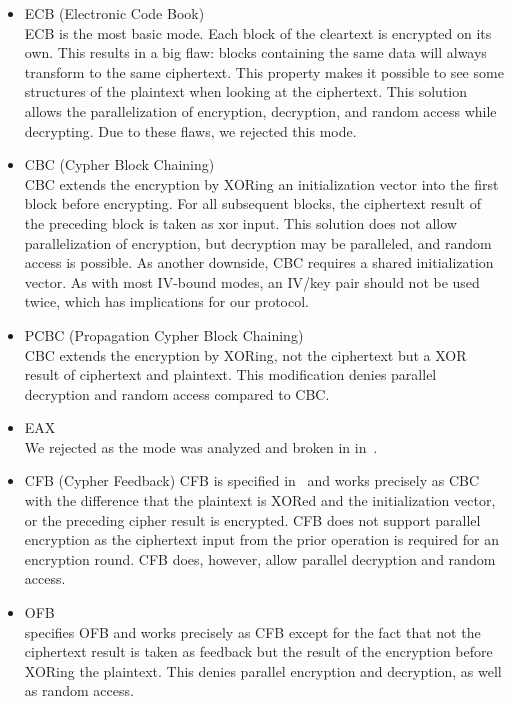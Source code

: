 \begin{itemize}
	\item ECB (Electronic Code Book)\\
	ECB is the most basic mode. Each block of the cleartext is encrypted on its own. This results in a big flaw: blocks containing the same data will always transform to the same ciphertext. This property makes it possible to see some structures of the plaintext when looking at the ciphertext. This solution allows the parallelization of encryption, decryption, and random access while decrypting. Due to these flaws, we rejected this mode.
	\item CBC (Cypher Block Chaining)\\  
	CBC extends the encryption by XORing an initialization vector into the first block before encrypting. For all subsequent blocks, the ciphertext result of the preceding block is taken as xor input. This solution does not allow parallelization of encryption, but decryption may be paralleled, and random access is possible. As another downside, CBC requires a shared initialization vector. As with most IV-bound modes, an IV/key pair should not be used twice, which has implications for our protocol.
	\item PCBC (Propagation Cypher Block Chaining)\\
	CBC extends the encryption by XORing, not the ciphertext but a XOR result of ciphertext and plaintext. This modification denies parallel decryption and random access compared to CBC.
	\item EAX\\      
	We rejected as the mode was analyzed and broken in \citeyear{minematsu2013attacks} in~\cite{minematsu2013attacks}.
	\item CFB (Cypher Feedback)
	CFB is specified in~\cite{dworkin2001recommendation} and works precisely as CBC with the difference that the plaintext is XORed and the initialization vector, or the preceding cipher result is encrypted. CFB does not support parallel encryption as the ciphertext input from the prior operation is required for an encryption round. CFB does, however, allow parallel decryption and random access.
	\item OFB\\
	\cite{dworkin2001recommendation} specifies OFB and works precisely as CFB except for the fact that not the ciphertext result is taken as feedback but the result of the encryption before XORing the plaintext. This denies parallel encryption and decryption, as well as random access.

\end{itemize}
